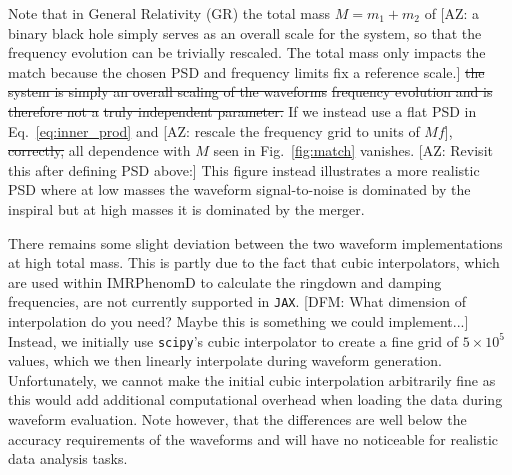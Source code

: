 \documentclass[twocolumn]{aastex631}
\newcommand{\jax}{\texttt{JAX}\xspace}
\newcommand{\AZ}[1]{{\color{Burnt}[AZ: #1]}}
\newcommand{\dfm}[1]{{\color{dfm}[DFM: #1]}}
\begin{document}
Note that in General Relativity (GR) the total mass $M = m_1 + m_2$ of \AZ{a binary black hole simply serves as an overall scale for the system, so that the frequency evolution can be trivially rescaled.
The total mass only impacts the match because the chosen PSD and frequency limits fix a reference scale.}
\sout{the system is simply an overall scaling of the waveforms} 
\sout{frequency evolution and is therefore not a} \sout{truly independent parameter.}
If we instead use a flat PSD in Eq.~\ref{eq:inner_prod} and \AZ{rescale the frequency grid to units of $Mf$}, \sout{correctly,} all dependence with $M$ seen in Fig.~\ref{fig:match} vanishes. 
\AZ{Revisit this after defining PSD above:} 
This figure instead illustrates a more realistic PSD where at low masses the waveform signal-to-noise is dominated by the inspiral but at high masses it is dominated by the merger.

There remains some slight deviation between the two waveform implementations at high total mass. 
This is partly due to the fact that cubic interpolators, which are used within IMRPhenomD to calculate the ringdown and damping frequencies, are not currently supported in \jax. \dfm{What dimension of interpolation do you need? Maybe this is something we could implement...}
Instead, we initially use \texttt{scipy}'s cubic interpolator to create a fine grid of $5\times10^5$ values, which we then linearly interpolate during waveform generation.
Unfortunately, we cannot make the initial cubic interpolation arbitrarily fine as this would add additional computational overhead when loading the data during waveform evaluation.
Note however, that the differences are well below the accuracy requirements of the waveforms and will have no noticeable for realistic data analysis tasks.
\end{document}
